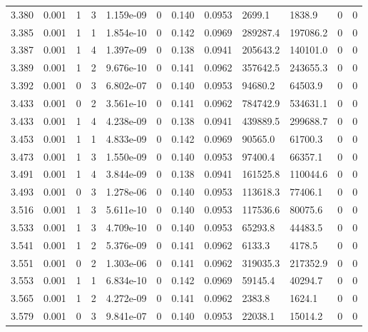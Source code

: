 \documentclass[preview]{standalone}
\begin{document}
{{{{{\begin{tabular}{L{1.2cm}C{1.2cm} C{0.3cm}C{0.5cm} C{1.4cm}C{1.4cm} C{1.4cm}C{1.4cm} C{1.6cm}C{1.6cm} C{1.6cm}C{1.6cm}}
  3.380  &  0.001  & 1     &  3 &  1.159e-09  & 0  &  0.140&   0.0953& 2699.1 & 1838.9   &  0 & 0  \\ 
  3.385  &  0.001  & 1     &  1 &  1.854e-10  & 0  &  0.142&   0.0969& 289287.4 & 197086.2   &  0 & 0  \\ 
  3.387  &  0.001  & 1     &  4 &  1.397e-09  & 0  &  0.138&   0.0941& 205643.2 & 140101.0   &  0 & 0  \\ 
  3.389  &  0.001  & 1     &  2 &  9.676e-10  & 0  &  0.141&   0.0962& 357642.5 & 243655.3   &  0 & 0  \\ 
  3.392  &  0.001  & 0     &  3 &  6.802e-07  & 0  &  0.140&   0.0953& 94680.2 & 64503.9   &  0 & 0  \\ 
  3.433  &  0.001  & 0     &  2 &  3.561e-10  & 0  &  0.141&   0.0962& 784742.9 & 534631.1   &  0 & 0  \\ 
  3.433  &  0.001  & 1     &  4 &  4.238e-09  & 0  &  0.138&   0.0941& 439889.5 & 299688.7   &  0 & 0  \\ 
  3.453  &  0.001  & 1     &  1 &  4.833e-09  & 0  &  0.142&   0.0969& 90565.0 & 61700.3   &  0 & 0  \\ 
  3.473  &  0.001  & 1     &  3 &  1.550e-09  & 0  &  0.140&   0.0953& 97400.4 & 66357.1   &  0 & 0  \\ 
  3.491  &  0.001  & 1     &  4 &  3.844e-09  & 0  &  0.138&   0.0941& 161525.8 & 110044.6   &  0 & 0  \\ 
  3.493  &  0.001  & 0     &  3 &  1.278e-06  & 0  &  0.140&   0.0953& 113618.3 & 77406.1   &  0 & 0  \\ 
  3.516  &  0.001  & 1     &  3 &  5.611e-10  & 0  &  0.140&   0.0953& 117536.6 & 80075.6   &  0 & 0  \\ 
  3.533  &  0.001  & 1     &  3 &  4.709e-10  & 0  &  0.140&   0.0953& 65293.8 & 44483.5   &  0 & 0  \\ 
  3.541  &  0.001  & 1     &  2 &  5.376e-09  & 0  &  0.141&   0.0962& 6133.3 & 4178.5   &  0 & 0  \\ 
  3.551  &  0.001  & 0     &  2 &  1.303e-06  & 0  &  0.141&   0.0962& 319035.3 & 217352.9   &  0 & 0  \\ 
  3.553  &  0.001  & 1     &  1 &  6.834e-10  & 0  &  0.142&   0.0969& 59145.4 & 40294.7   &  0 & 0  \\ 
  3.565  &  0.001  & 1     &  2 &  4.272e-09  & 0  &  0.141&   0.0962& 2383.8 & 1624.1   &  0 & 0  \\ 
  3.579  &  0.001  & 0     &  3 &  9.841e-07  & 0  &  0.140&   0.0953& 22038.1 & 15014.2   &  0 & 0  \\ 

\end{tabular}}}}}}
\end{document}
